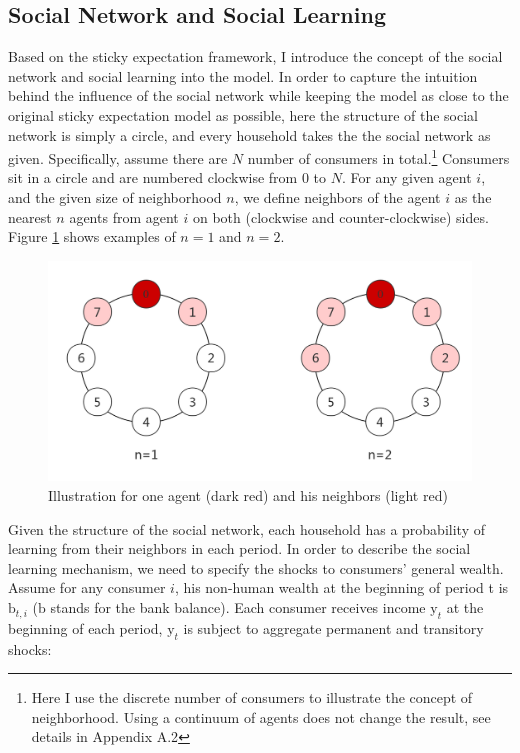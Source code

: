 \documentclass[12pt,letterpaper]{article}
\begin{document}
\subsection{Social Network and Social Learning}
Based on the sticky expectation framework, I introduce the concept of the social network and social learning into the model. In order to capture the intuition behind the influence of the social network while keeping the model as close to the original sticky expectation model as possible, here the structure of the social network is simply a circle, and every household takes the the social network as given. Specifically, assume there are $N$ number of consumers in total.\footnote{Here I use the discrete number of consumers to illustrate the concept of neighborhood. Using a continuum of agents does not change the result,  see details in Appendix A.2} Consumers sit in a circle and are numbered clockwise from 0 to $N$. For any given agent $i$, and the given size of neighborhood $n$, we define neighbors of the agent $i$ as the nearest $n$ agents from agent $i$ on both (clockwise and counter-clockwise) sides. Figure \ref{figure:social_network} shows examples of $n=1$ and $n=2$.
\begin{figure}[h]
	\includegraphics[scale=0.25]{Social_Network.png}
	\centering
	\caption{Illustration for one agent (dark red) and his neighbors (light red)}
	\label{figure:social_network}
\end{figure}
\par
Given the structure of the social network, each household has a probability of learning from their neighbors in each period. In order to describe the social learning mechanism, we need to specify the shocks to consumers' general wealth. Assume for any consumer $i$, his non-human wealth at the beginning of period t is $\mathrm{b}_{t,i}$ ($\mathrm{b}$ stands for the bank balance). Each consumer receives income $\mathrm{y}_{t}$ at the beginning of each period, $\mathrm{y}_{t}$ is subject to aggregate permanent and transitory shocks:
\end{document}
